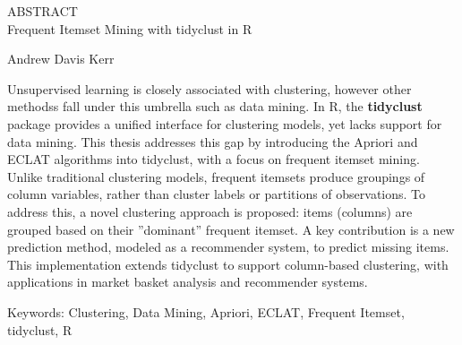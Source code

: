 \begin{center}
ABSTRACT \\
Frequent Itemset Mining with tidyclust in R

Andrew Davis Kerr
\end{center}

Unsupervised learning is closely associated with clustering, however other methodss
fall under this umbrella such as data mining. In R, the \textbf{tidyclust} package provides a 
unified interface for clustering models, yet lacks support for data mining. This 
thesis addresses this gap by introducing the Apriori and ECLAT algorithms into tidyclust, 
with a focus on frequent itemset mining. Unlike traditional clustering models, frequent 
itemsets produce groupings of column variables, rather than cluster labels or partitions 
of observations. To address this, a novel clustering approach is proposed: items (columns) 
are grouped based on their ”dominant” frequent itemset. A key contribution is a new
prediction method, modeled as a recommender system, to predict missing items. This 
implementation extends tidyclust to support column-based clustering, with applications 
in market basket analysis and recommender systems.

Keywords: Clustering, Data Mining, Apriori, ECLAT, Frequent Itemset, tidyclust, R
\clearpage